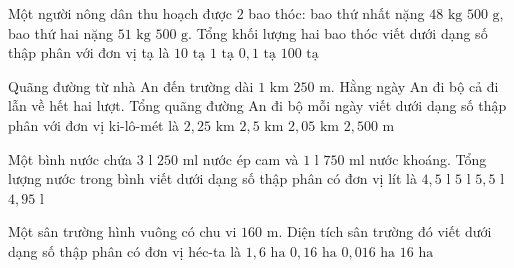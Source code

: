 \begin{ex} %
Một người nông dân thu hoạch được $2$ bao thóc: bao thứ nhất nặng $48\text{ kg } 500\text{ g}$, bao thứ hai nặng $51\text{ kg } 500\text{ g}$. Tổng khối lượng hai bao thóc viết dưới dạng số thập phân với đơn vị tạ là
\choice
{$10\text{ tạ}$}
{\True $1\text{ tạ}$}
{$0{,}1\text{ tạ}$}
{$100\text{ tạ}$}
\end{ex}

\begin{ex} %
Quãng đường từ nhà An đến trường dài $1\text{ km } 250\text{ m}$. Hằng ngày An đi bộ cả đi lẫn về hết hai lượt. Tổng quãng đường An đi bộ mỗi ngày viết dưới dạng số thập phân với đơn vị ki-lô-mét là
\choice
{$2{,}25\text{ km}$}
{\True $2{,}5\text{ km}$}
{$2{,}05\text{ km}$}
{$2{,}500\text{ m}$}
\end{ex}

\begin{ex} %
Một bình nước chứa $3\text{ l } 250\text{ ml}$ nước ép cam và $1\text{ l } 750\text{ ml}$ nước khoáng. Tổng lượng nước trong bình viết dưới dạng số thập phân có đơn vị lít là
\choice
{$4{,}5\text{ l}$}
{\True $5\text{ l}$}
{$5{,}5\text{ l}$}
{$4{,}95\text{ l}$}
\end{ex}

\begin{ex} %
Một sân trường hình vuông có chu vi $160\text{ m}$. Diện tích sân trường đó viết dưới dạng số thập phân có đơn vị héc-ta là
\choice
{$1{,}6\text{ ha}$}
{\True $0{,}16\text{ ha}$}
{$0{,}016\text{ ha}$}
{$16\text{ ha}$}
\end{ex}

